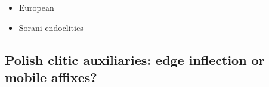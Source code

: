 \documentclass[output=paper 	        ,biblatex                ,babelshorthands                ,newtxmath                ,draftmode                ,colorlinks, citecolor=brown]{langscibook}
\begin{document}
\begin{itemize}
\item European  \citep{crysmann_b03book}
  
\item Sorani  endoclitics \citep{Bonami08f,Walther12}

\end{itemize}

\subsection{Polish clitic auxiliaries: edge inflection or mobile affixes?}

\citet{borsley_r99} \citet{Kupsc05} \citet{crysmann_b09degruyter}



 

\printbibliography[heading=subbibliography,notkeyword=this] 
\end{document}
